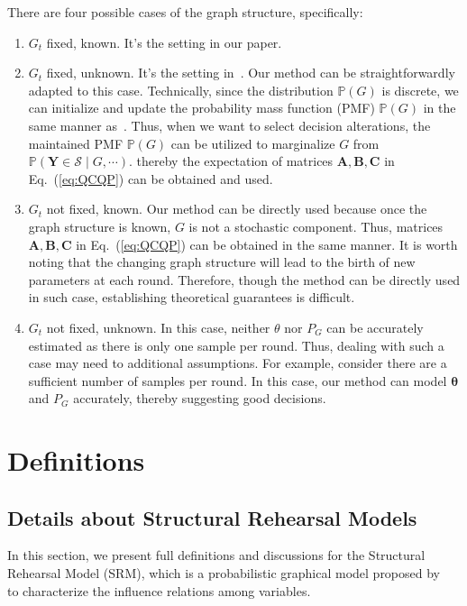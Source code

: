 \documentclass{article}
\theoremstyle{plain}
\theoremstyle{definition}
\theoremstyle{remark}
\def \sS {\mathcal{S}}
\def \Y {\mathbf{Y}}
\def \A {\mathbf{A}}
\def \B {\mathbf{B}}
\def \C {\mathbf{C}}
\begin{document}
  There are four possible cases of the graph structure, specifically:
  \begin{enumerate}
    \item[1] $G_t$ fixed, known. It's the setting in our paper.
    \item[2] $G_t$ fixed, unknown. It's the setting in~\citet{qint2023srm}. Our method can be straightforwardly adapted to this case.
    Technically, since the distribution $\mathbb{P}(G)$ is discrete, we can initialize and update the probability mass function (PMF) $\mathbb{P}(G)$ in the same manner as~\citet{qint2023srm}. Thus, when we want to select decision alterations, the maintained PMF $\mathbb{P}(G)$ can be utilized to marginalize $G$ from $\mathbb{P}(\Y\in \sS\mid G, \cdots)$. thereby the expectation of matrices $\A, \B, \C$ in Eq.~(\ref{eq:QCQP}) can be obtained and used. 
    \item[3] $G_t$ not fixed, known. Our method can be directly used because once the graph structure is known, $G$ is not a stochastic component. Thus, matrices $\A, \B, \C$ in Eq.~(\ref{eq:QCQP}) can be obtained in the same manner. It is worth noting that the changing graph structure will lead to the birth of new parameters at each round. Therefore, though the method can be directly used in such case, establishing theoretical guarantees is difficult.
    \item[4]  $G_t$ not fixed, unknown. In this case, neither $\theta$ nor $P_G$ can be accurately estimated as there is only one sample per round. Thus, dealing with such a case may need to additional assumptions. For example, consider there are a sufficient number of samples per round. In this case, our method can model $\bm{\theta}$ and $P_G$ accurately, thereby suggesting good decisions.
  \end{enumerate}



\section{Definitions}
\subsection{Details about Structural Rehearsal Models}
\label{app:SRM}
In this section, we present full definitions and discussions for the Structural Rehearsal Model (SRM), 
which is a probabilistic graphical model proposed by~\cite{qint2023srm} to characterize the influence relations among variables.
\end{document}
